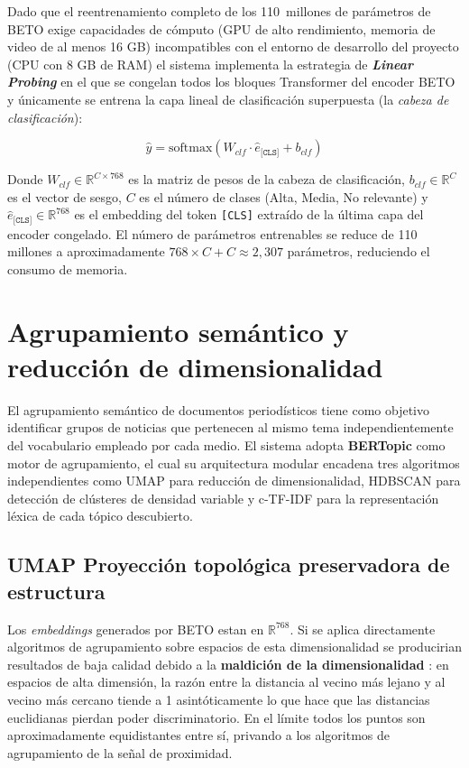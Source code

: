 Dado que el reentrenamiento completo de los 110~millones de parámetros de BETO
exige capacidades de cómputo (GPU de alto rendimiento, memoria de video de
al menos 16 GB) incompatibles con el entorno de desarrollo del proyecto (CPU
con 8 GB de RAM) el sistema implementa la estrategia de \textbf{\textit{Linear
Probing}} en el que se congelan todos los bloques Transformer del encoder BETO y
únicamente se entrena la capa lineal de clasificación superpuesta (la \textit{cabeza de clasificación}):

\begin{equation}
    \hat{y} = \text{softmax}\!\left(W_{clf} \cdot \hat{e}_{\texttt{[CLS]}} + b_{clf}\right)
\end{equation}

Donde $W_{clf} \in \mathbb{R}^{C \times 768}$ es la matriz de pesos de la cabeza
de clasificación, $b_{clf} \in \mathbb{R}^{C}$ es el vector de sesgo, $C$ es el
número de clases (Alta, Media, No relevante) y $\hat{e}_{\texttt{[CLS]}} \in
\mathbb{R}^{768}$ es el embedding del token \texttt{[CLS]} extraído de la última
capa del encoder congelado. El número de parámetros entrenables se reduce de
110 millones a aproximadamente $768 \times C + C \approx 2{,}307$ parámetros,
reduciendo el consumo de memoria.


\section{Agrupamiento semántico y reducción de dimensionalidad}
\label{sec:mt_clustering}


El agrupamiento semántico de documentos periodísticos tiene como objetivo identificar
grupos de noticias que pertenecen al mismo tema independientemente del vocabulario
empleado por cada medio. El sistema adopta \textbf{BERTopic} \cite{grootendorst2022bertopic}
como motor de agrupamiento, el cual su arquitectura modular encadena tres algoritmos
independientes como UMAP para reducción de dimensionalidad, HDBSCAN para detección de
clústeres de densidad variable y c-TF-IDF para la representación léxica de cada
tópico descubierto.

\subsection{UMAP Proyección topológica preservadora de estructura}
\label{subsec:mt_umap}

Los \textit{embeddings} generados por BETO estan en $\mathbb{R}^{768}$. Si se aplica
directamente algoritmos de agrupamiento sobre espacios de esta dimensionalidad se
producirian resultados de baja calidad debido a la \textbf{maldición de la dimensionalidad} \cite{beyer1999nearest}: 
en espacios de alta dimensión, la razón entre la distancia al vecino más lejano y al vecino más
cercano tiende a 1 asintóticamente lo que hace que las distancias euclidianas pierdan
poder discriminatorio. En el límite todos los puntos son aproximadamente equidistantes
entre sí, privando a los algoritmos de agrupamiento de la señal de proximidad.

